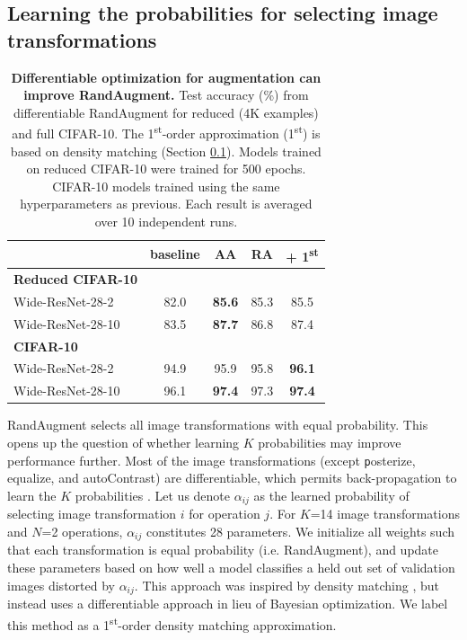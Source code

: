 \subsection{Learning the probabilities for selecting image transformations}
\label{first_order_term}

\begin{table}[t]
\centering
\small
\begin{tabular}{l|cc|cc}
    & \footnotesize{baseline} &   AA    &  RA & + 1\textsuperscript{st} \\
  \hline  
  \textbf{Reduced CIFAR-10} &&&&\\
  Wide-ResNet-28-2 &  82.0 & \textbf{85.6} & 85.3 & 85.5\\ 
  Wide-ResNet-28-10 & 83.5&  \textbf{87.7} & 86.8 & 87.4\\ 
  \hline 
  \textbf{CIFAR-10} &&&&\\
  Wide-ResNet-28-2 & 94.9  & 95.9 & 95.8 & \textbf{96.1}\\ 
  Wide-ResNet-28-10 & 96.1&  \textbf{97.4} & 97.3 & \textbf{97.4}\\ 
  \hline
\end{tabular}
\vspace{0.2cm}
\caption{\textbf{Differentiable optimization for augmentation can improve RandAugment.} Test accuracy (\%) from differentiable RandAugment for reduced (4K examples) and full CIFAR-10. The 1\textsuperscript{st}-order approximation (1\textsuperscript{st}) is based on density matching (Section \ref{first_order_term}). Models trained on reduced CIFAR-10 were trained for 500 epochs. CIFAR-10 models trained using the same hyperparameters as previous. Each result is averaged over 10 independent runs.}
\label{tab:diff_results}  
\vspace{-0.5cm}
\end{table}

RandAugment selects all image transformations with equal probability. This opens up the question of whether learning $K$ probabilities may improve performance further. Most of the image transformations (except 
{\footnotesize {\texttt posterize, equalize, and autoContrast}}) 
are differentiable, which permits back-propagation to learn the $K$ probabilities \cite{liu2018darts}.
Let us denote $\alpha_{ij}$ as the learned probability of selecting image transformation $i$ for operation $j$.
For $K$=14 image transformations and $N$=2 operations, $\alpha_{ij}$ constitutes 28 parameters. We initialize all weights such that each transformation is equal probability (i.e. RandAugment), and update these parameters based on how well a model classifies a held out set of validation images distorted by $\alpha_{ij}$.
This approach was inspired by density matching \cite{lim2019fast}, but instead uses a differentiable approach in  lieu of Bayesian optimization. We label this method as a 1\textsuperscript{st}-order density matching approximation.


